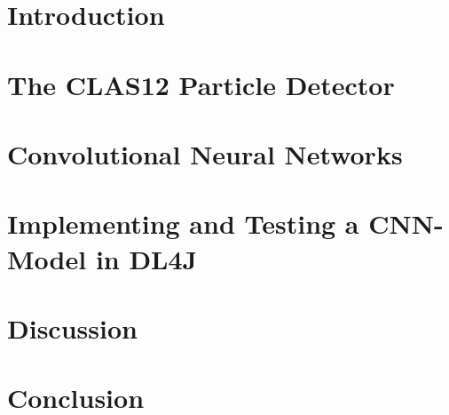 \documentclass[a4paper, english]{scrreprt}
\begin{document}


\onehalfspacing


\setcounter{tocdepth}{3}
\setcounter{secnumdepth}{3}
\tableofcontents

\chapter{Introduction}

\chapter{The CLAS12 Particle Detector}



\chapter{Convolutional Neural Networks}

\chapter{Implementing and Testing a CNN-Model in DL4J}

\chapter{Discussion}

\chapter{Conclusion}

\printbibliography

\listoffigures
\end{document}
